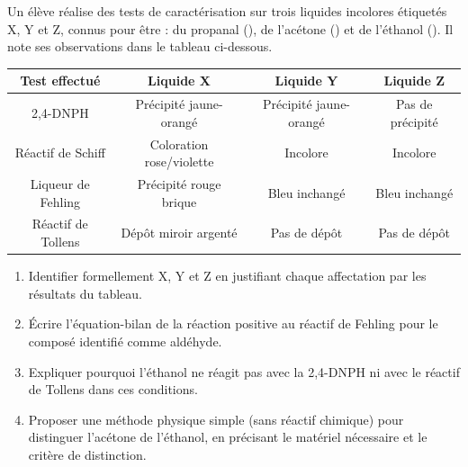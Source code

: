 \documentclass[11pt]{article}
\begin{document}
\begin{exercice}
Un élève réalise des tests de caractérisation sur trois liquides incolores étiquetés X, Y et Z, connus pour être : du propanal (), de l'acétone () et de l'éthanol (). Il note ses observations dans le tableau ci-dessous.

\begin{center}
\begin{tabular}{|c|c|c|c|}
\hline
Test effectué & Liquide X & Liquide Y & Liquide Z \\
\hline
2,4-DNPH & Précipité jaune-orangé & Précipité jaune-orangé & Pas de précipité \\
Réactif de Schiff & Coloration rose/violette & Incolore & Incolore \\
Liqueur de Fehling & Précipité rouge brique & Bleu inchangé & Bleu inchangé \\
Réactif de Tollens & Dépôt miroir argenté & Pas de dépôt & Pas de dépôt \\
\hline
\end{tabular}
\end{center}

\begin{enumerate}
    \item Identifier formellement X, Y et Z en justifiant chaque affectation par les résultats du tableau.
    \item Écrire l'équation-bilan de la réaction positive au réactif de Fehling pour le composé identifié comme aldéhyde.
    \item Expliquer pourquoi l'éthanol ne réagit pas avec la 2,4-DNPH ni avec le réactif de Tollens dans ces conditions.
    \item Proposer une méthode physique simple (sans réactif chimique) pour distinguer l'acétone de l'éthanol, en précisant le matériel nécessaire et le critère de distinction.
\end{enumerate}
\end{exercice}
\end{document}
